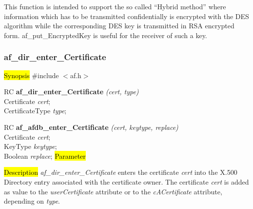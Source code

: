 This function is intended to support the so called ``Hybrid method'' where information which
has to be transmitted confidentially is encrypted with the DES algorithm while the corresponding DES key
is transmitted in RSA encrypted form. af\_put\_EncryptedKey is useful for the receiver
of such a key.

\subsubsection{af\_dir\_enter\_Certificate}
\label{af_enter_Certificate}
\hl{Synopsis}
\#include $<$af.h$>$ 

RC {\bf af\_dir\_enter\_Certificate} {\em (cert, type)} \\
Certificate {\em *cert}; \\
CertificateType {\em type}; 

RC {\bf af\_afdb\_enter\_Certificate} {\em (cert, keytype, replace)} \\
Certificate {\em *cert}; \\
KeyType {\em keytype}; \\
Boolean {\em replace};
\hl{Parameter}




\hl{Description}
{\em af\_dir\_enter\_Certificate} enters the certificate {\em cert} into the X.500 Directory 
entry associated with the certificate owner. The certificate {\em cert} is added as value
to the {\em userCertificate} attribute or to the {\em cACertificate} attribute,
depending on {\em type}.

